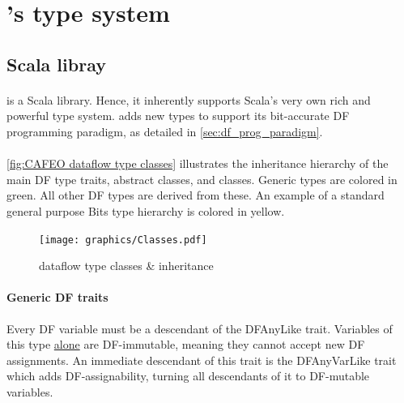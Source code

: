 \newpage
\section{\cfns's type system}
\label{sec:type_system}
\subsection{\cf Scala libray}

\paragraph{}\cf is a Scala library. Hence, it inherently supports Scala's very own rich and powerful type system. \cf adds new types to support its bit-accurate DF programming paradigm, as detailed in \autoref{sec:df_prog_paradigm}. 

\paragraph{}\autoref{fig:CAFEO dataflow type classes} illustrates the inheritance hierarchy of the main DF type traits, abstract classes, and classes. Generic types are colored in green. All other DF types are derived from these. An example of a standard general purpose Bits type hierarchy is colored in yellow. 

\begin{figure}[htb]
  \centering
  \texttt{[image: graphics/Classes.pdf]}
  \caption{\cf dataflow type classes \& inheritance}\label{fig:CAFEO dataflow type classes}
\end{figure}

\paragraph{Generic DF traits}Every DF variable must be a descendant of the DFAnyLike trait. %
Variables of this type \underline{alone} are DF-immutable, meaning they cannot accept new DF assignments. An immediate descendant of this trait is the DFAnyVarLike %
trait which adds DF-assignability, turning all descendants of it to DF-mutable variables.

